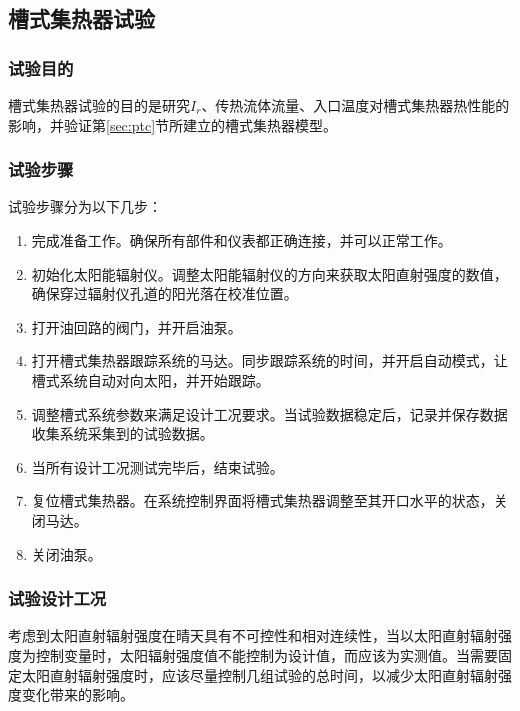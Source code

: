 \subsection{槽式集热器试验}
\subsubsection{试验目的}
槽式集热器试验的目的是研究$I_r$、传热流体流量、入口温度对槽式集热器热性能的影响，并验证第\ref{sec:ptc}节所建立的槽式集热器模型。

\subsubsection{试验步骤}
试验步骤分为以下几步：
\begin{enumerate}[label=(\arabic*)]
	\item 完成准备工作。确保所有部件和仪表都正确连接，并可以正常工作。
	\item 初始化太阳能辐射仪。调整太阳能辐射仪的方向来获取太阳直射强度的数值，确保穿过辐射仪孔道的阳光落在校准位置。
	\item 打开油回路的阀门，并开启油泵。
	\item 打开槽式集热器跟踪系统的马达。同步跟踪系统的时间，并开启自动模式，让槽式系统自动对向太阳，并开始跟踪。
	\item 调整槽式系统参数来满足设计工况要求。当试验数据稳定后，记录并保存数据收集系统采集到的试验数据。
	\item 当所有设计工况测试完毕后，结束试验。
	\item 复位槽式集热器。在系统控制界面将槽式集热器调整至其开口水平的状态，关闭马达。
	\item 关闭油泵。
\end{enumerate}

\subsubsection{试验设计工况}

考虑到太阳直射辐射强度在晴天具有不可控性和相对连续性，当以太阳直射辐射强度为控制变量时，太阳辐射强度值不能控制为设计值，而应该为实测值。当需要固定太阳直射辐射强度时，应该尽量控制几组试验的总时间，以减少太阳直射辐射强度变化带来的影响。


